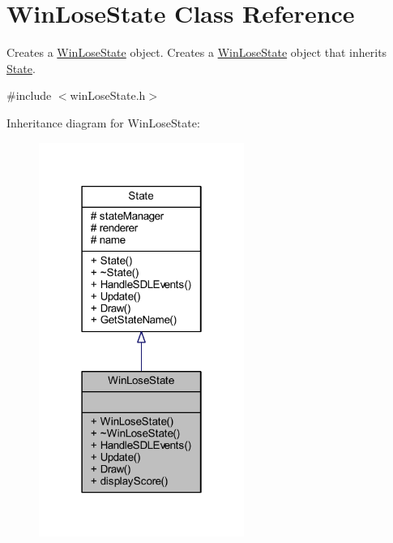 \hypertarget{class_win_lose_state}{\section{Win\+Lose\+State Class Reference}
\label{class_win_lose_state}
}


Creates a \hyperlink{class_win_lose_state}{Win\+Lose\+State} object. Creates a \hyperlink{class_win_lose_state}{Win\+Lose\+State} object that inherits \hyperlink{class_state}{State}.  




{\ttfamily \#include $<$win\+Lose\+State.\+h$>$}



Inheritance diagram for Win\+Lose\+State\+:
\nopagebreak
\begin{figure}[H]
\begin{center}
\leavevmode
\includegraphics[width=190pt]{class_win_lose_state__inherit__graph}
\end{center}
\end{figure}


